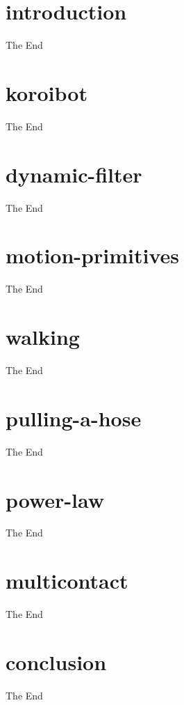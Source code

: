 \documentclass{beamer}
\begin{document}
\begin{frame}{}
  \titlepage
\end{frame}

\section{introduction}
\setcounter{subsection}{1}
\begin{frame}{The End}
\end{frame}

\section{koroibot}
\setcounter{subsection}{2}
\begin{frame}{The End}
\end{frame}

\section{dynamic-filter}
\setcounter{subsection}{3}
\begin{frame}{The End}
\end{frame}

\section{motion-primitives}
\setcounter{subsection}{4}
\begin{frame}{The End}
\end{frame}

\section{walking}
\setcounter{subsection}{5}
\begin{frame}{The End}
\end{frame}

\section{pulling-a-hose}
\setcounter{subsection}{6}
\begin{frame}{The End}
\end{frame}

\section{power-law}
\setcounter{subsection}{7}

\begin{frame}{The End}
\end{frame}

\section{multicontact}
\setcounter{subsection}{8}

\begin{frame}{The End}
\end{frame}


\section{conclusion}
\setcounter{subsection}{9}

\begin{frame}{The End}
\end{frame}
\end{document}
